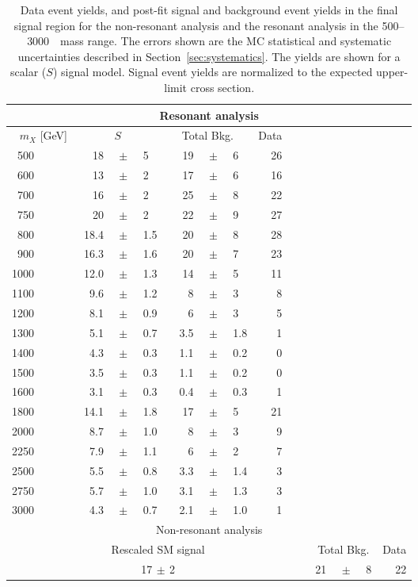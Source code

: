  
\begin{table}
\small
\begin{center}
\begin{tabular}{r|*{4}{r@{}c@{}l|}r}
\hline
\multicolumn{14}{c}{Resonant analysis} \\
\hline
$m_X$ [GeV] & \multicolumn{3}{c}{$S$} & \multicolumn{3}{c}{Total Bkg.} & Data \\
\hline
500~~~~~~& 18  &$\,\pm\,$&5   & 19&$\,\pm\,$&6 & 26 \\
600~~~~~~& 13  &$\,\pm\,$&2   & 17&$\,\pm\,$&6 & 16 \\
700~~~~~~& 16  &$\,\pm\,$&2   & 25&$\,\pm\,$&8 & 22 \\
750~~~~~~& 20  &$\,\pm\,$&2   & 22&$\,\pm\,$&9 & 27 \\
800~~~~~~& 18.4&$\,\pm\,$&1.5 & 20&$\,\pm\,$&8 & 28 \\
900~~~~~~& 16.3&$\,\pm\,$&1.6 & 20&$\,\pm\,$&7 & 23 \\

1000~~~~~~& 12.0&$\,\pm\,$&1.3 & 14&$\,\pm\,$&5 & 11 \\
1100~~~~~~& ~~9.6&$\,\pm\,$&1.2 & ~~8&$\,\pm\,$&3 & 8\\
1200~~~~~~& ~~8.1&$\,\pm\,$&0.9 & ~~6&$\,\pm\,$&3 & 5 \\
1300~~~~~~& ~~5.1&$\,\pm\,$&0.7 & ~~3.5&$\,\pm\,$&1.8 & 1\\
1400~~~~~~& 4.3&$\,\pm\,$&0.3 &  ~~1.1&$\,\pm\,$&0.2 & 0 \\
1500~~~~~~& 3.5&$\,\pm\,$&0.3 & 1.1&$\,\pm\,$&0.2 & 0 \\
1600~~~~~~& 3.1&$\,\pm\,$&0.3 & ~~0.4&$\,\pm\,$&0.3 & 1 \\
1800~~~~~~& 14.1&$\,\pm\,$&1.8 & 17&$\,\pm\,$&5 & 21 \\
2000~~~~~~& 8.7&$\,\pm\,$&1.0 & 8&$\,\pm\,$&3 & 9 \\
2250~~~~~~& 7.9&$\,\pm\,$&1.1 & 6&$\,\pm\,$&2 & 7 \\
2500~~~~~~& 5.5&$\,\pm\,$&0.8 & 3.3&$\,\pm\,$&1.4 &  3\\
2750~~~~~~& 5.7&$\,\pm\,$&1.0 & 3.1&$\,\pm\,$&1.3 & 3\\
3000~~~~~~& 4.3&$\,\pm\,$&0.7 & 2.1&$\,\pm\,$&1.0 & 1 \\
\hline
\multicolumn{14}{c}{Non-resonant analysis} \\
\hline
\multicolumn{10}{c|}{Rescaled SM signal} & \multicolumn{3}{c}{Total Bkg.} & Data \\
\hline
\multicolumn{10}{c|}{17$\,\pm\,$2} & 21&$\,\pm\,$&8 & 22\\
\end{tabular}
\caption{Data event yields, and post-fit signal and background event yields in the final signal region for the non-resonant analysis and the resonant analysis in the 500--3000~\GeV\ mass range. The errors shown
are the MC statistical and systematic uncertainties described in
Section~\ref{sec:systematics}. The yields are shown for a scalar ($S$) signal model. Signal event yields are normalized to the expected upper-limit cross section.}  
\label{tab:event_yields_low}
\end{center}
\end{table}
 
